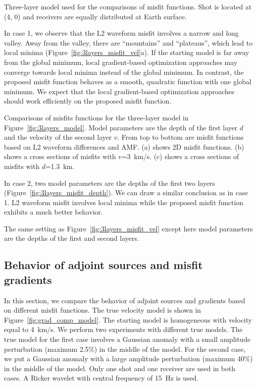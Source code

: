 {\label{fig:3layers_model}
Three-layer model used for the comparisons of misfit functions. Shot 
is located at (4, 0) and receivers are equally distributed 
at Earth surface.}
 
In case 1, we observe that the L2 waveform misfit involves a narrow and long valley.
Away from the valley, there are ``mountains'' and ``plateaus'', which 
lead to local minima (Figure~\ref{fig:3layers_misfit_vel}a). 
If the starting model is far away from the global minimum, 
local gradient-based optimization approaches may converge towards local minima 
instead of the global minimum. In contrast, the proposed misfit function
behaves as a smooth, quadratic function with 
one global minimum. We expect that the local gradient-based 
optimization approaches should work efficiently on the proposed misfit function. 

{\label{fig:3layers_misfit_vel}
Comparisons of misfits functions for the three-layer model in Figure~\ref{fig:3layers_model}. 
Model parameters are the depth of the first layer $d$ and the velocity of 
the second layer $v$. From top to bottom are misfit functions based on L2 
waveform differences and AMF. (a) shows 2D misfit functions. 
(b) shows a cross sections of misfits with $v$=3~km/s. 
(c) shows a cross sections of misfits with $d$=1.3~km. 
}

In case 2, two model parameters are the depths of the first two layers (Figure~\ref{fig:3layers_misfit_depth}). 
We can draw a similar conclusion as in case 1. L2 waveform misfit involves local minima  
while the proposed misfit function exhibits a much better behavior. 

{\label{fig:3layers_misfit_depth}
The same setting as Figure~\ref{fig:3layers_misfit_vel} except here model parameters are the depths of 
the first and second layers. 
}

\subsection{Behavior of adjoint sources and misfit gradients}
In this section, we compare the behavior of adjoint sources and gradients based on different misfit 
functions. The true velocity model is shown 
in Figure~\ref{fig:grad_comp_model}. The starting model is homogeneous with velocity equal 
to 4~km/s. We perform two experiments with different true models.
The true model for the first case involves a Gaussian anomaly with a small amplitude 
perturbation (maximum 2.5\%) in the middle of the model. For the second case, 
we put a Gaussian anomaly with a large amplitude perturbation (maximum 40\%) in the middle 
of the model. Only one shot and one receiver are used in both cases. 
A Ricker wavelet with central frequency of 15~Hz is used.

